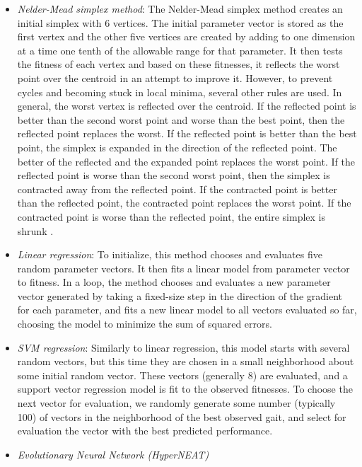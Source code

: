 \begin{itemize}
\item \emph{Nelder-Mead simplex method}\cite{nm}: The Nelder-Mead
  simplex method creates an initial simplex with 6 vertices. The
  initial parameter vector is stored as the first vertex and the other
  five vertices are created by adding to one dimension at a time one
  tenth of the allowable range for that parameter. It then tests the
  fitness of each vertex and based on these fitnesses, it reflects the
  worst point over the centroid in an attempt to improve it.  However,
  to prevent cycles and becoming stuck in local minima, several other
  rules are used.  In general, the worst vertex is reflected over the
  centroid. If the reflected point is better than the second worst
  point and worse than the best point, then the reflected point
  replaces the worst. If the reflected point is better than the best
  point, the simplex is expanded in the direction of the reflected
  point. The better of the reflected and the expanded point replaces
  the worst point. If the reflected point is worse than the second
  worst point, then the simplex is contracted away from the reflected
  point. If the contracted point is better than the reflected point,
  the contracted point replaces the worst point. If the contracted
  point is worse than the reflected point, the entire simplex is
  shrunk \cite{NMWebsite}.

\item \emph{Linear regression}: To initialize, this method chooses and
  evaluates five random parameter vectors. It then fits a linear model
  from parameter vector to fitness. In a loop, the method chooses and
  evaluates a new parameter vector generated by taking a fixed-size
  step in the direction of the gradient for each parameter, and fits a
  new linear model to all vectors evaluated so far, choosing the model
  to minimize the sum of squared errors.

\item \emph{SVM regression}: Similarly to linear regression, this
  model starts with several random vectors, but this time they are
  chosen in a small neighborhood about some initial random vector.
  These vectors (generally 8) are evaluated, and a support vector
  regression model is fit to the observed fitnesses.  To choose the
  next vector for evaluation, we randomly generate some number
  (typically 100) of vectors in the neighborhood of the best observed
  gait, and select for evaluation the vector with the best predicted
  performance.


\item \emph{Evolutionary Neural Network (HyperNEAT)\cite{clune}}


\end{itemize}



